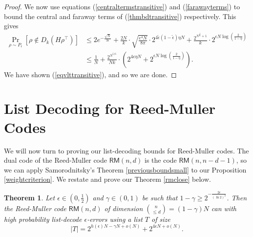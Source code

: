 \documentclass[12pt]{article}
\newtheorem*{theorem*}{Theorem}
\begin{document}
\begin{proof}
We now use equations (\ref{centraltermstransitive}) and (\ref{farawayterms}) to bound the central and faraway terms of (\ref{thmbdtransitive}) respectively. This gives
\begin{align*}
\Pr_{\rho\sim P_\epsilon}[\rho\notin D_k(H\rho^\intercal)]&\leq 2e^{-\frac{\sqrt{N}}{3\epsilon}}+\frac{2N}{k}\cdot \sqrt{\frac{e^4 N}{8\pi}}\cdot 2^{4\tilde{\epsilon}(1-\tilde{\epsilon})\eta N}
+\frac{2^{N^{\frac{4}{5}}+1}}{k} \cdot 2^{\epsilon N\log(\frac{2}{1-\eta})}\\
&\leq \frac{1}{N}+\frac{2^{N^{5/6}}}{Nk}\cdot (2^{4\epsilon \eta N}+2^{\epsilon N\log(\frac{2}{1-\eta})}).
\end{align*}
We have shown (\ref{eqvlttransitive}), and so we are done.
\end{proof}

\section{List Decoding for Reed-Muller Codes}\label{listrm}
We will now turn to proving our list-decoding bounds for Reed-Muller codes. The dual code of the Reed-Muller code $\mathsf{RM}(n,d)$ is the code $\mathsf{RM}(n,n-d-1)$, so we can apply Samorodnitsky's Theorem \ref{previousboundsmall} to our Proposition \ref{weightcriterion}. We restate and prove our Theorem \ref{rmclose} below.
\begin{theorem*}
Let $\epsilon\in(0,\frac{1}{2})$ and $\gamma\in(0,1)$ be such that $1-\gamma\geq 2^{-\frac{2\epsilon}{(\ln2)^2}}$. Then the Reed-Muller code $\mathsf{RM}(n,d)$ of dimension $\binom{n}{\leq d}=(1-\gamma)N$ can with high probability list-decode $\epsilon$-errors using a list $T$ of size
     $$|T|=2^{h(\epsilon)N-\gamma N+o(N)}+2^{4\epsilon N+o(N)} .$$
\end{theorem*}
\end{document}
